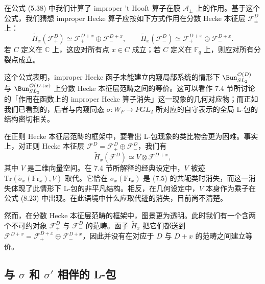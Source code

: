在公式 (5.38) 中我们计算了 improper 't Hooft 算子在膜 $\mathcal{A}_\pm$ 上的作用。基于这个公式，我们猜想 improper Hecke 算子应按如下方式作用在分数 Hecke 本征层 $\mathcal{F}^D_\pm$ 上：
\[
\tilde{H}_x(\mathcal{F}^D_+) \simeq \mathcal{F}^{D+x}_+ \oplus \mathcal{F}^{D+x}_-,\qquad
\tilde{H}_x(\mathcal{F}^D_-) \simeq \mathcal{F}^{D+x}_+ \oplus \mathcal{F}^{D+x}_-.
\]
若 $C$ 定义在 $\mathbb{C}$ 上，这应对所有点 $x\in C$ 成立；若 $C$ 定义在 $\mathbb{F}_q$ 上，则应对所有分裂点成立。


这个公式表明，improper Hecke 函子未能建立内窥局部系统的情形下 $\Bun^{\mathcal{O}(D)}_{SL_2}$ 与 $\Bun^{\mathcal{O}(D+x)}_{SL_2}$ 上分数 Hecke 本征层范畴之间的等价。这可以看作 7.4 节所讨论的「作用在函数上的 improper Hecke 算子消失」这一现象的几何对应物；而正如我们已看到的，后者与内窥同态 $\sigma : W_F \to PGL_2$ 所对应的自守表示的全局 L-包的结构密切相关。

在正则 Hecke 本征层范畴的框架中，要看出 L-包现象的类比物会更为困难。事实上，对正则 Hecke 本征层 $\mathcal{F}^D = \mathcal{F}^D_+\oplus \mathcal{F}^D_-$，我们有
\begin{equation}\tag{8.23}
\tilde{H}_x(\mathcal{F}^D) \simeq V\otimes \mathcal{F}^{D+x},
\end{equation}
其中 $V$ 是二维向量空间。在 7.4 节所解释的经典设定中，$V$ 被迹 $\mathrm{Tr}(\tilde{\sigma}_x(\mathrm{Fr}_x), V)$ 取代。它恰在 $\sigma_x(\mathrm{Fr}_x)$
是 (7.5) 的共轭类时消失，而这一消失体现了此情形下 L-包的非平凡结构。相反，在几何设定中，$V$ 本身作为乘子在公式 (8.23) 中出现。在此语境中什么应取代迹的消失，目前尚不清楚。


然而，在分数 Hecke 本征层范畴的框架中，图景更为透明。此时我们有一个含两个不可约对象 $\mathcal{F}^D_+$ 与 $\mathcal{F}^D_-$ 的范畴。函子 $\tilde{H}_x$ 把它们都送到 $\mathcal{F}^{D+x} = \mathcal{F}^{D+x}_+\oplus \mathcal{F}^{D+x}_-$，因此并没有在对应于 $D$ 与 $D+x$ 的范畴之间建立等价。

\subsection{与 \texorpdfstring{$\sigma$}{σ} 和 \texorpdfstring{$\sigma'$}{σ′} 相伴的 L-包}

